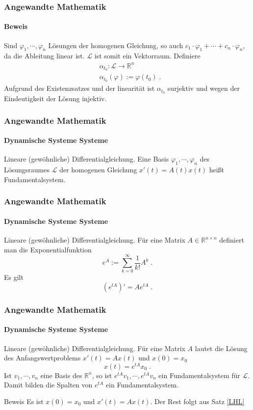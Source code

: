 \documentclass{beamer}
\begin{document}
\begin{frame}
    \frametitle{Angewandte Mathematik}
\framesubtitle{Beweis}
Sind  $\varphi_1, \cdots, \varphi_n$ Lösungen der homogenen Gleichung, so auch $ c_1 \cdot \varphi_1 + \cdots + c_n \cdot \varphi_n$, da die Ableitung linear ist.
$\mathcal{L}$ ist somit ein Vektorraum. Definiere 
\begin{align*}
& \alpha_{t_0} : \mathcal{L} \to \mathbb{R}^n \\
& \alpha_{t_0} (\varphi) := \varphi(t_0) \; .
\end{align*} 
Aufgrund des Existenzsatzes und der linearität ist $ \alpha_{t_0}$ surjektiv und wegen der Eindeutigkeit der Lösung injektiv.
 \end{frame}


\begin{frame}
    \frametitle{Angewandte Mathematik}
\framesubtitle{Dynamische Systeme Systeme}
\begin{block}{Lineare (gewöhnliche) Differentialgleichung.}
Eine Basis  $\varphi_1, \cdots, \varphi_n$ des Lösungsraumes $\mathcal{L}$ der homogenen Gleichung $x'(t) = A(t)x(t)$ heißt Fundamentalsystem.
\end{block}

 \end{frame}

\begin{frame}
    \frametitle{Angewandte Mathematik}
\framesubtitle{Dynamische Systeme Systeme}
\begin{block}{Lineare (gewöhnliche) Differentialgleichung.}
Für eine Matrix $A \in \mathbb{R}^{n \times n}$ definiert man die Exponentialfunktion 
$$  e^{ A}  := \sum_{k= 0}^{\infty} \frac{1}{k!} A^k \; .$$
Es gilt  
$$  (e^{ tA})' = A e^{tA}  \; .$$
\end{block}

 \end{frame}

\begin{frame}
    \frametitle{Angewandte Mathematik}
\framesubtitle{Dynamische Systeme Systeme}
\begin{block}{Lineare (gewöhnliche) Differentialgleichung.}
Für eine Matrix $A$ lautet die Lösung des Anfangswertproblems $x'(t) = Ax(t)$ und $x(0) = x_0$
$$ x(t) = e^{tA} x_0 \;.$$ Ist $v_1, \cdots , v_n$ eine Basis des $\mathbb{R}^n$, so ist $e^{tA}v_1, \cdots , e^{tA}v_n$ ein Fundamentalsystem für $\mathcal{L}$. Damit bilden die Spalten von  $e^{tA}$ ein Fundamentalsystem.
\end{block}

\begin{block}{Beweis}
Es ist $x(0) = x_0$ und $x'(t)= A x(t)$. Der Rest folgt aus Satz  \ref{LHL}
\end{block}
 \end{frame}
\end{document}
